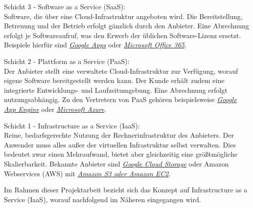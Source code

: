 \documentclass[13pt,a4paper,bibliography=totocnumbered,listof=totocnumbered]{scrartcl}
\begin{document}
\begin{compactitem}
\item Schicht 3 - Software as a Service (SaaS):\\
Software, die über eine Cloud-Infrastruktur angeboten wird. Die Bereitstellung, Betreuung und der Betrieb erfolgt gänzlich durch den Anbieter. Eine Abrechnung erfolgt je Softwareaufruf, was den Erwerb der üblichen Software-Lizenz ersetzt. Beispiele hierfür sind \href{http://www.google.com/enterprise/apps/business/}{\textit{Google Apps}} oder \href{http://office.microsoft.com/de-de/business/was-ist-office-365-fur-unternehmen-FX102997580.aspx}{\textit{Microsoft Office 365}}.
\item Schicht 2 - Plattform as a Service (PaaS):\\
Der Anbieter stellt eine verwaltete Cloud-Infrastruktur zur Verfügung, worauf eigene Software bereitgestellt werden kann. Der Kunde erhält zudem eine integrierte Entwicklungs- und Laufzeitumgebung. Eine Abrechnung erfolgt nutzungsabhängig. Zu den Vertretern von PaaS gehören beispielsweise \href{https://cloud.google.com/appengine/}{\textit{Google App Engine}} oder \href{http://azure.microsoft.com/de-de/}{\textit{Microsoft Azure}}.
\item Schicht 1 - Infrastructure as a Service (IaaS):\\
Reine, bedarfsgerechte Nutzung der Rechnerinfrastruktur des Anbieters. Der Anwender muss alles außer der virtuellen Infrastruktur selbst verwalten. Dies bedeutet zwar einen Mehraufwand, bietet aber gleichzeitig eine größtmögliche Skalierbarkeit. Bekannte Anbieter sind \href{https://cloud.google.com/storage/}{\textit{Google Cloud Storage}} oder Amazon Webservices (AWS) mit \href{http://aws.amazon.com/de/}{\textit{Amazon S3 oder Amazon EC2}}.
\end{compactitem}

\cite{35} \cite[S. 65f.]{41} \cite[S. 2f.]{34}

Im Rahmen dieser Projektarbeit bezieht sich das Konzept auf Infrastructure as a Service (IaaS), worauf nachfolgend im Näheren eingegangen wird.
\end{document}
